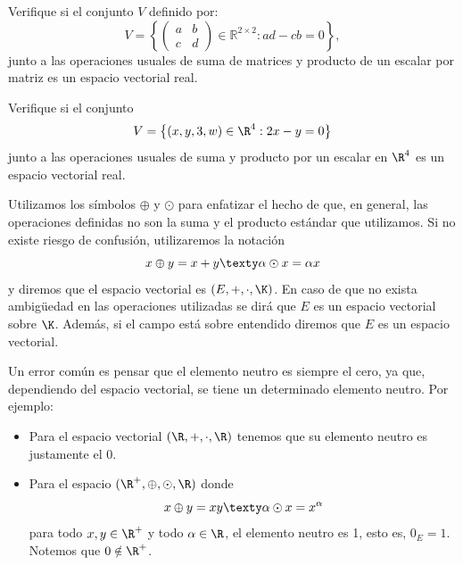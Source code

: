 \documentclass[compacto,10pt]{pubciencias-notas}
\begin{document}
\begin{ejer}\hspace{0pt} Verifique si el conjunto $V$ definido por:
\[V=\left\{\left(\begin{array}{cc}
    a & b \\
    c & d
\end{array}\right)\in\mathbb{R}^{2\times 2} : ad-cb=0\right\},\]
junto a las operaciones usuales de suma de matrices y producto de un escalar por matriz es un espacio vectorial real.
\end{ejer}

\begin{ejer} Verifique si el conjunto 
\[V=\left\lbrace (x,y,3,w)\in\R^4 : 2x-y=0 \right\rbrace\]
junto a las operaciones usuales de suma y producto por un escalar en $\R^4$ es un espacio vectorial real.
\end{ejer}

\begin{obs}
    Utilizamos los símbolos $\oplus$ y $\odot$ para enfatizar el hecho de que, en general, las operaciones definidas no son la suma y el producto estándar que utilizamos. Si no existe riesgo de confusión, utilizaremos la notación
    \[
        x\oplus y = x+y
        \texty
        \alpha \odot x = \alpha x
    \]
    y diremos que el espacio vectorial es $(E,+,\cdot,\K)$.
    En caso de que no exista ambigüedad en las operaciones utilizadas se dirá que $E$ es un espacio vectorial sobre $\K$. Además, si el campo está sobre entendido diremos que $E$ es un espacio vectorial.
\end{obs}

\begin{advertencia}
Un error común es pensar que el elemento neutro es siempre el cero, ya que, dependiendo del espacio vectorial, se tiene un determinado elemento neutro. Por ejemplo:
\begin{itemize}
\item Para el espacio vectorial $(\R, +, \cdot, \R)$ tenemos que su elemento neutro es justamente el 0.
\item Para el espacio $(\R^{+}, \oplus , \odot, \R)$ donde 
\[
    x \oplus y = xy
    \texty
    \alpha \odot x = x^{\alpha}
\]
para todo $x,y\in\R^{+}$ y todo $\alpha\in\R$, el elemento neutro es 1, esto es, $0_{E} = 1$. Notemos que $0\notin\R^{+}$.
\end{itemize}
\end{advertencia}
\end{document}
